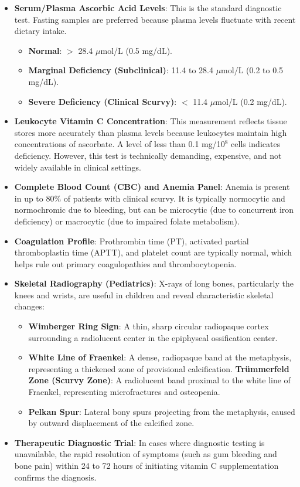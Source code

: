 \begin{itemize}
    \item \textbf{Serum/Plasma Ascorbic Acid Levels}: This is the standard diagnostic test. Fasting samples are preferred because plasma levels fluctuate with recent dietary intake.
        \begin{itemize}
            \item \textbf{Normal}: $>$ 28.4 $\mu$mol/L (0.5 mg/dL).
            \item \textbf{Marginal Deficiency (Subclinical)}: 11.4 to 28.4 $\mu$mol/L (0.2 to 0.5 mg/dL).
            \item \textbf{Severe Deficiency (Clinical Scurvy)}: $<$ 11.4 $\mu$mol/L (0.2 mg/dL).
        \end{itemize}
    \item \textbf{Leukocyte Vitamin C Concentration}: This measurement reflects tissue stores more accurately than plasma levels because leukocytes maintain high concentrations of ascorbate. A level of less than 0.1 mg/10$^{8}$ cells indicates deficiency. However, this test is technically demanding, expensive, and not widely available in clinical settings.
    \item \textbf{Complete Blood Count (CBC) and Anemia Panel}: Anemia is present in up to 80\% of patients with clinical scurvy. It is typically normocytic and normochromic due to bleeding, but can be microcytic (due to concurrent iron deficiency) or macrocytic (due to impaired folate metabolism).
    \item \textbf{Coagulation Profile}: Prothrombin time (PT), activated partial thromboplastin time (APTT), and platelet count are typically normal, which helps rule out primary coagulopathies and thrombocytopenia.
    \item \textbf{Skeletal Radiography (Pediatrics)}: X-rays of long bones, particularly the knees and wrists, are useful in children and reveal characteristic skeletal changes:
        \begin{itemize}
            \item \textbf{Wimberger Ring Sign}: A thin, sharp circular radiopaque cortex surrounding a radiolucent center in the epiphyseal ossification center.
            \item \textbf{White Line of Fraenkel}: A dense, radiopaque band at the metaphysis, representing a thickened zone of provisional calcification.
            \textbf{Tr\"{u}mmerfeld Zone (Scurvy Zone)}: A radiolucent band proximal to the white line of Fraenkel, representing microfractures and osteopenia.
            \item \textbf{Pelkan Spur}: Lateral bony spurs projecting from the metaphysis, caused by outward displacement of the calcified zone.
        \end{itemize}
    \item \textbf{Therapeutic Diagnostic Trial}: In cases where diagnostic testing is unavailable, the rapid resolution of symptoms (such as gum bleeding and bone pain) within 24 to 72 hours of initiating vitamin C supplementation confirms the diagnosis.
\end{itemize}

